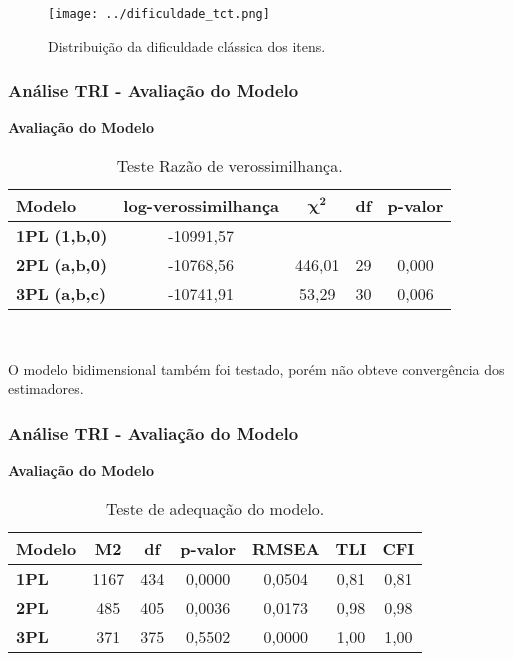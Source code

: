 \documentclass{beamer}
\begin{document}
	\begin{frame}
	
	\begin{figure}
		\caption{Distribuição da dificuldade clássica dos itens.}
		\texttt{[image: ../dificuldade\_tct.png]}
	\end{figure}

		
	\end{frame}
	

	
	\begin{frame}
		
		\frametitle{Análise TRI - Avaliação do Modelo}
		
		\begin{center}
			\textbf{Avaliação do Modelo}
		\end{center}
		
		\begin{table}
			\centering
			\caption{Teste Razão de verossimilhança.}
			\begin{tabular}{lcccc}
				\hline
				\textbf{Modelo} &  \textbf{ log-verossimilhança }& $\boldsymbol{\chi^2}$ & \textbf{df} & \textbf{p-valor }\\ 
				\hline
				\textbf{1PL} \textbf{(1,b,0)} &  -10991,57 &  &  &  \\ 
				\hline
				\textbf{2PL} \textbf{(a,b,0)} & -10768,56 & 446,01 & 29 & 0,000 \\ 
				\hline
				\textbf{3PL} \textbf{(a,b,c)} & -10741,91 & 53,29 & 30 & 0,006 \\ 
				\hline
			\end{tabular}\\
		\end{table}
		
	O modelo bidimensional também foi testado, porém não obteve convergência dos estimadores.
		
	\end{frame}
	

\begin{frame}
	
	\frametitle{Análise TRI - Avaliação do Modelo}
	
	\begin{center}
		\textbf{Avaliação do Modelo}
	\end{center}
	
	
	\begin{table}
		\centering
		\caption{Teste de adequação do modelo.}
		\begin{tabular}{lcccccc}
			\hline
			\textbf{Modelo} & \textbf{M2}& \textbf{df} & \textbf{p-valor} & \textbf{RMSEA} & \textbf{TLI} & \textbf{CFI} \\ 
			\hline 
			\textbf{1PL} & 1167 & 434 & 0,0000 & 0,0504 & 0,81 & 0,81 \\ 
		\hline	\textbf{2PL} & 485 & 405 & 0,0036 & 0,0173 & 0,98 & 0,98 \\ 
		\hline	\textbf{3PL} & 371 & 375 & 0,5502 & 0,0000 & 1,00 & 1,00 \\ 
			\hline
		\end{tabular}
	\end{table}
\end{frame}
\end{document}
